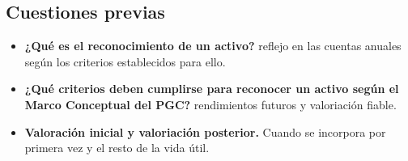 \documentclass[a4paper,12pt]{article}
\begin{document}
\subsection{Cuestiones previas}
\begin{itemize}
    \item \textbf{¿Qué es el reconocimiento de un activo?} reflejo en las cuentas anuales según los criterios establecidos para ello.
    \item \textbf{¿Qué criterios deben cumplirse para reconocer un activo según el Marco Conceptual del PGC?} rendimientos futuros  y valoriación fiable.
    \item \textbf{Valoración inicial y valoriación posterior.} Cuando se incorpora por primera vez y el resto de la vida útil.
\end{itemize}
\end{document}
